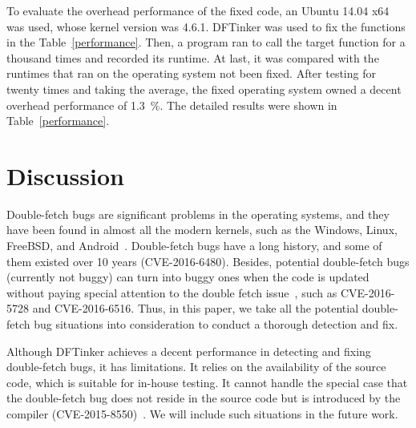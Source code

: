\documentclass[10pt]{llncs}
\begin{document}
To evaluate the overhead performance of the fixed code, an Ubuntu 14.04 x64 was used, whose kernel version was 4.6.1. DFTinker was used to fix the functions in the Table~\ref{performance}. Then, a program ran to call the target function for a thousand times and recorded its runtime. At last, it was compared with the runtimes that ran on the operating system not been fixed. After testing for twenty times and taking the average, the fixed operating system owned a decent overhead performance of 1.3~\%. The detailed results were shown in Table~\ref{performance}.

\section{Discussion}%
\label{discuss}

Double-fetch bugs are significant problems in the operating systems, and they have been found in almost all the modern kernels, such as the Windows, Linux, FreeBSD, and Android~\cite{wang}. Double-fetch bugs have a long history, and some of them existed over 10 years (CVE-2016-6480). Besides, potential double-fetch bugs (currently not buggy) can turn into buggy ones when the code is updated without paying special attention to the double fetch issue~\cite{wang}, such as CVE-2016-5728 and CVE-2016-6516. Thus, in this paper, we take all the potential double-fetch bug situations into consideration to conduct a thorough detection and fix.


Although DFTinker achieves a decent performance in detecting and fixing double-fetch bugs, it has limitations. It relies on the availability of the source code, which is suitable for in-house testing. It cannot handle the special case that the double-fetch bug does not reside in the source code but is introduced by the compiler (CVE-2015-8550)~\cite{wilhelm15tracing}. We will include such situations in the future work. 


\end{document}
